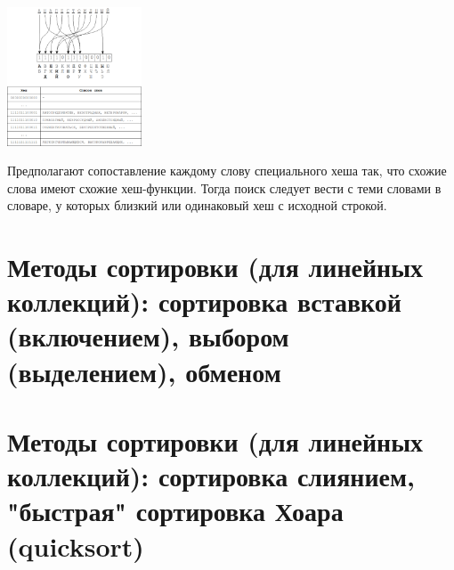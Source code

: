 \begin{center}
  \includegraphics[width=0.3\textwidth]{resources/19-26/hash.png}
\end{center}
Предполагают сопоставление каждому слову специального хеша так, что схожие слова имеют схожие хеш-функции. Тогда поиск следует вести с
теми словами в словаре, у которых близкий или одинаковый хеш с исходной строкой.
\section{Методы сортировки (для линейных коллекций): сортировка вставкой (включением), выбором (выделением), обменом}
\section{Методы сортировки (для линейных коллекций): сортировка слиянием, "быстрая" сортировка Хоара (quicksort)}
